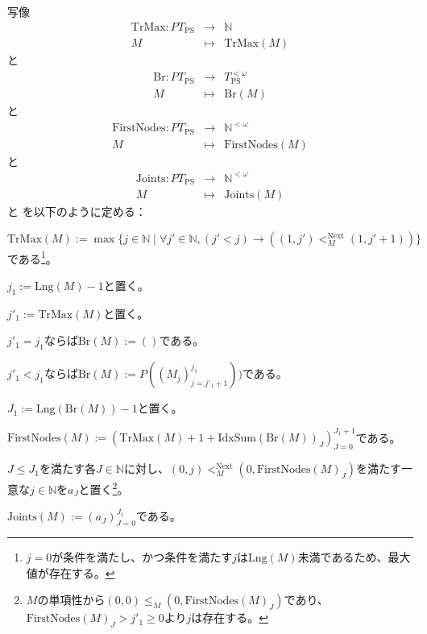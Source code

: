 \documentclass[dvipdfmx,uplatex]{jsarticle}
\theoremstyle{customnonumberbreakfortheorem}
\theoremstyle{customnonumberbreakforproof}
\begin{document}
写像
\begin{eqnarray*}
\textrm{TrMax} \colon PT_{\textrm{PS}} & \to & \mathbb{N} \\
M & \mapsto & \textrm{TrMax}(M)
\end{eqnarray*}
と
\begin{eqnarray*}
\textrm{Br} \colon PT_{\textrm{PS}} & \to & T_{\textrm{PS}}^{< \omega} \\
M & \mapsto & \textrm{Br}(M)
\end{eqnarray*}
と
\begin{eqnarray*}
\textrm{FirstNodes} \colon PT_{\textrm{PS}} & \to & \mathbb{N}^{< \omega} \\
M & \mapsto & \textrm{FirstNodes}(M)
\end{eqnarray*}
と
\begin{eqnarray*}
\textrm{Joints} \colon PT_{\textrm{PS}} & \to & \mathbb{N}^{< \omega} \\
M & \mapsto & \textrm{Joints}(M)
\end{eqnarray*}
と
を以下のように定める：
\begin{nenumerate}
	\item \(\textrm{TrMax}(M) := \max \{j \in \mathbb{N} \mid \forall j' \in \mathbb{N}, (j' < j) \to ((1,j') <_M^{\textrm{Next}} (1,j'+1))\}\)である\footnote{\(j = 0\)が条件を満たし、かつ条件を満たす\(j\)は\(\textrm{Lng}(M)\)未満であるため、最大値が存在する。}。
	\item \(j_1 := \textrm{Lng}(M) - 1\)と置く。
	\item \(j'_1 := \textrm{TrMax}(M)\)と置く。
	\item \(j'_1 = j_1\)ならば\(\textrm{Br}(M) := ()\)である。
	\item \(j'_1 < j_1\)ならば\(\textrm{Br}(M) := P((M_j)_{j=j'_1+1}^{j_1}))\)である。
	\item \(J_1 := \textrm{Lng}(\textrm{Br}(M))-1\)と置く。
	\item \(\textrm{FirstNodes}(M) := (\textrm{TrMax}(M) + 1 + \textrm{IdxSum}(\textrm{Br}(M))_J)_{J=0}^{J_1+1}\)である。
	\item \(J \leq J_1\)を満たす各\(J \in \mathbb{N}\)に対し、\((0,j) <_M^{\textrm{Next}} (0,\textrm{FirstNodes}(M)_J)\)を満たす一意な\(j \in \mathbb{N}\)を\(a_J\)と置く\footnote{\(M\)の単項性から\((0,0) \leq_M (0,\textrm{FirstNodes}(M)_J)\)であり、\(\textrm{FirstNodes}(M)_J > j'_1 \geq 0\)より\(j\)は存在する。}。
	\item \(\textrm{Joints}(M) := (a_J)_{J=0}^{J_1}\)である。
\end{nenumerate}
\end{document}
